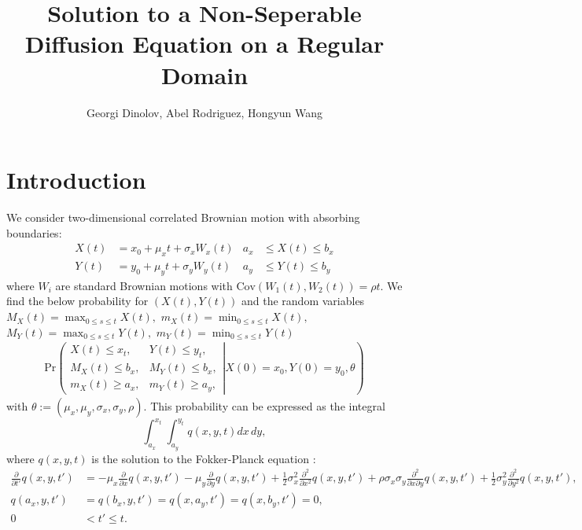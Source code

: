 \documentclass[10pt]{article}
\title{Solution to a Non-Seperable Diffusion Equation on a Regular Domain}
\author{Georgi Dinolov, Abel Rodriguez, Hongyun Wang}
\date{} %
\begin{document}
\def\spacingset#1{\renewcommand{\baselinestretch}%
{#1}\small\normalsize} \spacingset{1}

\bigskip

\vspace{1cm}
\noindent

\spacingset{1.00} %
\section{Introduction}

We consider two-dimensional correlated Brownian motion with absorbing boundaries:
\begin{align}
  X(t) &= x_0 + \mu_x t + \sigma_x W_x(t) &a_x &\leq X(t) \leq b_x   \label{eq:X} \\
  Y(t) &= y_0 + \mu_y t + \sigma_y W_y(t) &a_y &\leq Y(t) \leq b_y   \label{eq:Y} 
\end{align}
where $W_i$ are standard Brownian motions with
$\mbox{Cov}(W_1(t), W_2(t)) = \rho t$. We find the below probability
for $(X(t), Y(t))$ and the random variables
$M_X(t)=\max_{0\leq s\leq t}X(t),$ $m_X(t)=\min_{0\leq s\leq t}X(t),$
$M_Y(t)=\max_{0\leq s\leq t}Y(t),$ $m_Y(t)=\min_{0\leq s\leq t}Y(t)$
\begin{align}
  \mbox{Pr}\left( \left. \begin{array}{ll}
                           X(t) \leq x_t, & Y(t) \leq y_t, \\
                           M_X(t) \leq b_x, & M_Y(t) \leq b_x, \\
                           m_X(t) \geq a_x, & m_Y(t) \geq a_y,
                         \end{array} \right| X(0) = x_0, Y(0) = y_0, \theta \right)
                                              \label{eq:CDF}
\end{align}
with $\theta := (\mu_x, \mu_y, \sigma_x, \sigma_y, \rho).$ This
probability can be expressed as the integral
\[
  \displaystyle \int_{a_x}^{x_t} \displaystyle \int_{a_y}^{y_t} q(x,y,t) dx\,dy,
\]
where $q(x,y,t)$ is the solution to the Fokker-Planck equation
\citep{oksendal2013stochastic}:
\begin{align}
  \displaystyle \frac{\partial}{\partial t'} q(x,y,t') &= -\mu_x \frac{\partial}{\partial x}q(x,y,t')
                                         - \mu_y \frac{\partial}{\partial y}q(x,y,t')
                                         + \frac{1}{2}\sigma_x^2 \frac{\partial^2}{\partial x^2}q(x,y,t')
                                         + \rho\sigma_x\sigma_y \frac{\partial^2}{\partial x \partial y}q(x,y,t')
                                         + \frac{1}{2}\sigma_y^2 \frac{\partial^2}{\partial y^2}q(x,y,t'),
  \label{eq:1} \\
  q(a_x, y,t') &= q(b_x,y,t') = q(x,a_y,t') = q(x,b_y,t') = 0, \label{eq:2} \\
   0 &< t' \leq t. \nonumber
\end{align}
\end{document}
